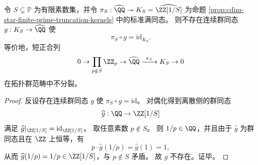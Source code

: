 \begin{corollary}[有限素数截断不存在连续分裂截面]\label{cor:cdim-star-no-continuous-section-finite-truncation}
令 \(S\subsetneq\mathbb P\) 为有限素数集，并令
\(
\pi_S:\widehat{\QQ}\twoheadrightarrow K_S=\widehat{\ZZ[1/S]}
\)
为命题 \ref{prop:cdim-star-finite-prime-truncation-kernels} 中的标准满同态。
则不存在连续群同态 \(g:K_S\to \widehat{\QQ}\) 使
\[
\pi_S\circ g=\mathrm{id}_{K_S}.
\]
等价地，短正合列
\[
0\to \prod_{p\notin S}\ZZ_p\to \widehat{\QQ}\xrightarrow{\ \pi_S\ }K_S\to 0
\]
在拓扑群范畴中不分裂。
\end{corollary}

\begin{proof}
反设存在连续群同态 \(g\) 使 \(\pi_S\circ g=\mathrm{id}\)。
对偶化得到离散侧的群同态
\[
\widehat g:\QQ\to \ZZ[1/S]
\]
满足 \(\widehat g|_{\ZZ[1/S]}=\mathrm{id}_{\ZZ[1/S]}\)。
取任意素数 \(p\notin S\)。
则 \(1/p\in\QQ\)，并且由于 \(\widehat g\) 为群同态且在 \(\ZZ\) 上恒等，有
\[
p\cdot \widehat g(1/p)=\widehat g(1)=1,
\]
从而 \(\widehat g(1/p)=1/p\in \ZZ[1/S]\)，与 \(p\notin S\) 矛盾。
故 \(g\) 不存在。证毕。
\end{proof}

